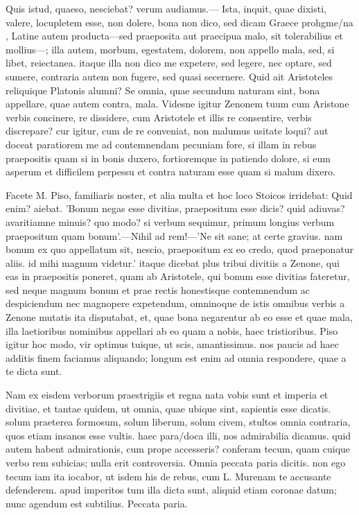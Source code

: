  Quis istud, quaeso, nesciebat? verum audiamus.— Ista, inquit, quae dixisti, valere, locupletem esse, non dolere, bona non dico, sed dicam Graece prohgme/na , Latine autem producta—sed praeposita aut praecipua malo, sit tolerabilius et mollius—; illa autem, morbum, egestatem, dolorem, non appello mala, sed, si libet, reiectanea. itaque illa non dico me expetere, sed legere, nec optare, sed sumere, contraria autem non fugere, sed quasi secernere. Quid ait Aristoteles reliquique Platonis alumni? Se omnia, quae secundum naturam sint, bona appellare, quae autem contra, mala. Videsne igitur Zenonem tuum cum Aristone verbis concinere, re dissidere, cum Aristotele et illis re consentire, verbis discrepare? cur igitur, cum de re conveniat, non malumus usitate loqui? aut doceat paratiorem me ad contemnendam pecuniam fore, si illam in rebus praepositis quam si in bonis duxero, fortioremque in patiendo dolore, si eum asperum et difficilem perpessu et contra naturam esse quam si malum dixero.

 Facete M. Piso, familiaris noster, et alia multa et hoc loco Stoicos irridebat: Quid enim? aiebat. 'Bonum negas esse divitias, praepositum esse dicis? quid adiuvas? avaritiamne minuis? quo modo? si verbum sequimur, primum longius verbum praepositum quam bonum'.—Nihil ad rem!—'Ne sit sane; at certe gravius. nam bonum ex quo appellatum sit, nescio, praepositum ex eo credo, quod praeponatur aliis. id mihi magnum videtur.' itaque dicebat plus tribui divitiis a Zenone, qui eas in praepositis poneret, quam ab Aristotele, qui bonum esse divitias fateretur, sed neque magnum bonum et prae rectis honestisque contemnendum ac despiciendum nec magnopere expetendum, omninoque de istis omnibus verbis a Zenone mutatis ita disputabat, et, quae bona negarentur ab eo esse et quae mala, illa laetioribus nominibus appellari ab eo quam a nobis, haec tristioribus. Piso igitur hoc modo, vir optimus tuique, ut scis, amantissimus. nos paucis ad haec additis finem faciamus aliquando; longum est enim ad omnia respondere, quae a te dicta sunt.

 Nam ex eisdem verborum praestrigiis et regna nata vobis sunt et imperia et divitiae, et tantae quidem, ut omnia, quae ubique sint, sapientis esse dicatis. solum praeterea formosum, solum liberum, solum civem, stultos omnia contraria, quos etiam insanos esse vultis. haec para/doca illi, nos admirabilia dicamus. quid autem habent admirationis, cum prope accesseris? conferam tecum, quam cuique verbo rem subicias; nulla erit controversia. Omnia peccata paria dicitis. non ego tecum iam ita iocabor, ut isdem his de rebus, cum L. Murenam te accusante defenderem. apud imperitos tum illa dicta sunt, aliquid etiam coronae datum; nunc agendum est subtilius. Peccata paria.

